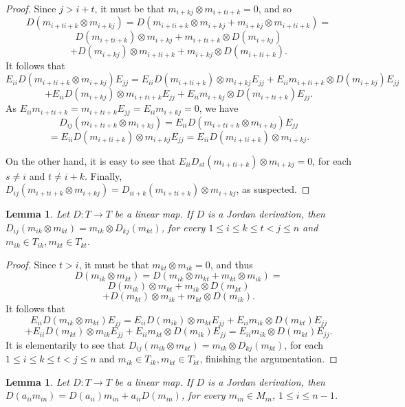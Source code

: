 \documentclass[12pt, reqno]{amsart}
\newtheorem{lemma}[theorem]{Lemma}
\theoremstyle{definition}
\numberwithin{equation}{section}
\begin{document}
\begin{proof} Since $j> i+t$, it must be that $m_{i+kj}\otimes m_{i+ti+k}=0$, and so $$D(m_{i+ti+k}\otimes m_{i+kj})=D(m_{i+ti+k}\otimes m_{i+kj}+m_{i+kj}\otimes m_{i+ti+k})=$$$$D(m_{i+ti+k})\otimes m_{i+kj}+m_{i+ti+k}\otimes D(m_{i+kj})$$$$+D(m_{i+kj})\otimes m_{i+ti+k}+m_{i+kj}\otimes D(m_{i+ti+k}).$$ It follows that $$E_{ii}D(m_{i+ti+k}\otimes m_{i+kj})E_{jj}=E_{ii}D(m_{i+ti+k})\otimes m_{i+kj}E_{jj}+E_{ii}m_{i+ti+k}\otimes D(m_{i+kj})E_{jj}$$$$+E_{ii}D(m_{i+kj})\otimes m_{i+ti+k}E_{jj}+E_{ii}m_{i+kj}\otimes D(m_{i+ti+k})E_{jj}.$$ As $E_{ii}m_{i+ti+k} = m_{i+ti+k}E_{jj}=E_{ii}m_{i+kj}=0$, we have $$D_{ij}(m_{i+ti+k}\otimes m_{i+kj})=E_{ii}D(m_{i+ti+k}\otimes m_{i+kj})E_{jj}$$$$=E_{ii}D(m_{i+ti+k})\otimes m_{i+kj}E_{jj}=E_{ii}D(m_{i+ti+k})\otimes m_{i+kj}.$$

On the other hand, it is easy to see that $E_{ii}D_{st}(m_{i+ti+k})\otimes m_{i+kj}=0$, for each $s\neq i$ and $t\neq i+k$. Finally, $D_{ij}( m_{i+ti+k}\otimes m_{i+kj})=D_{ii+k}(m_{i+ti+k})\otimes m_{i+kj}$, as suspected.
\end{proof}

\begin{lemma}\label{33} Let $D : T \longrightarrow T$ be a linear map. If $D$ is a Jordan derivation, then
$D_{ij}(m_{i k}\otimes m_{ kt})=m_{i k}\otimes D_{kj}(m_{ kt})$, for every $1\leq i \leq k\leq t< j \leq n$ and $m_{ik}\in T_{ik}, m_{kt}\in T_{kt}$.
\end{lemma}

\begin{proof} Since $t> i$, it must be that $m_{kt}\otimes m_{ik}=0$, and thus $$D(m_{ik}\otimes m_{kt})=D(m_{ik}\otimes m_{kt}+m_{kt}\otimes m_{ik})=$$$$D(m_{ik})\otimes m_{kt}+m_{ik}\otimes D(m_{kt})$$$$+D(m_{kt})\otimes m_{ik}+m_{kt}\otimes D(m_{ik}).$$ It follows that $$E_{ii}D(m_{ik}\otimes m_{kt})E_{jj}=E_{ii}D(m_{ik})\otimes m_{kt}E_{jj}+E_{ii}m_{ik}\otimes D(m_{kt})E_{jj}$$$$+E_{ii}D(m_{kt})\otimes m_{ik}E_{jj}+E_{ii}m_{kt}\otimes D(m_{ik})E_{jj}=E_{ii}m_{ik}\otimes D(m_{kt})E_{jj}.$$ It is elementarily to see that $D_{ij}(m_{i k}\otimes m_{ kt})=m_{i k}\otimes D_{kj}(m_{ kt})$, for each $1\leq i \leq k\leq t< j \leq n$ and $m_{ik}\in T_{ik}, m_{kt}\in T_{kt}$, finishing the argumentation.
\end{proof}

\begin{lemma}\label{d1} Let $D : T \longrightarrow T$ be a linear map. If $D$ is a Jordan derivation, then $D(a_{ii}m_{in})=D (a_{ii})m_{in}+a_{ii}D(m_{in})$, for every $m_{in}\in M_{in}$, $1\leq i \leq n-1$.
\end{lemma}
\end{document}
